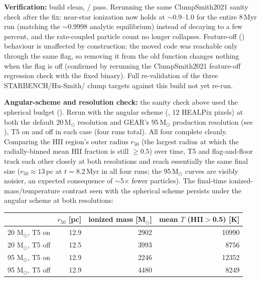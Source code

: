 \textbf{Verification:} build clean, /
 pass. Rerunning the same
ClumpSmith2021 sanity check after the fix: near-star ionization now holds
at $\sim$0.9--1.0 for the entire 8\,Myr run (matching the $\sim$0.9998
analytic equilibrium) instead of decaying to a few percent, and the
rate-coupled particle count no longer collapses. Feature-off
() behaviour is unaffected by
construction: the moved code was reachable only through the same flag, so
removing it from the old function changes nothing when the flag is off
(confirmed by rerunning the ClumpSmith2021 feature-off regression check
with the fixed binary). Full re-validation of the three STARBENCH/Hu-Smith/
clump targets against this build not yet re-run.

\textbf{Angular-scheme and resolution check:} the sanity check above used
the spherical budget (). Rerun with the angular scheme
(, 12 HEALPix pixels) at both the default 20\,M$_\odot$
resolution and GEAR's 95\,M$_\odot$ production resolution (see
), T5 on and off
in each case (four runs total). All four complete cleanly. Comparing the
HII region's outer radius $r_{50}$ (the largest radius at which the
radially-binned mean HII fraction is still $\geq 0.5$) over time, T5 and
flag-and-floor track each other closely at both resolutions and reach
essentially the same final size ($r_{50}\approx13\,$pc at $t=8.2\,$Myr in
all four runs; the 95\,M$_\odot$ curves are visibly noisier, an expected
consequence of $\sim$5$\times$ fewer particles). The final-time
ionized-mass/temperature contrast seen with the spherical scheme persists
under the angular scheme at both resolutions:

\begin{center}
\begin{tabular}{lrrr}
 & $r_{50}$ [pc] & ionized mass [M$_\odot$] & mean $T$ (HII$>$0.5) [K] \\
\hline
20 M$_\odot$, T5 on  & 12.9 & 2902 & 10990 \\
20 M$_\odot$, T5 off & 12.5 & 3993 &  8756 \\
95 M$_\odot$, T5 on  & 12.9 & 2246 & 12352 \\
95 M$_\odot$, T5 off & 12.9 & 4480 &  8249 \\
\end{tabular}
\end{center}

